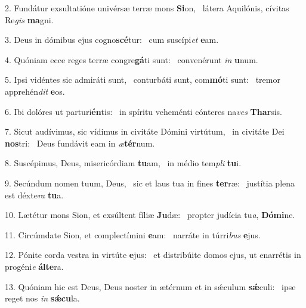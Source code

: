 2. Fundátur exsultatióne univérsæ terræ mons \textbf{Si}on, \ast\  látera Aquilónis, cívitas Re\textit{gis} \textbf{ma}gni.\

3. Deus in dómibus ejus cogno\textbf{scé}tur: \ast\  cum suscípi\textit{et} \textbf{e}am.\

4. Quóniam ecce reges terræ congre\textbf{gá}ti sunt: \ast\  convenérunt \textit{in} \textbf{u}num.\

5. Ipsi vidéntes sic admiráti sunt, \dag\  conturbáti sunt, com\textbf{mó}ti sunt: \ast\  tremor apprehén\textit{dit} \textbf{e}os.\

6. Ibi dolóres ut parturi\textbf{én}tis: \ast\  in spíritu veheménti cónteres na\textit{ves} \textbf{Thar}sis.\

7. Sicut audívimus, sic vídimus in civitáte Dómini virtútum, \dag\  in civitáte Dei \textbf{nos}tri: \ast\  Deus fundávit eam in \textit{æ}\textbf{tér}num.\

8. Suscépimus, Deus, misericórdiam \textbf{tu}am, \ast\  in médio tem\textit{pli} \textbf{tu}i.\

9. Secúndum nomen tuum, Deus, \dag\  sic et laus tua in fines \textbf{ter}ræ: \ast\  justítia plena est déxte\textit{ra} \textbf{tu}a.\

10. Lætétur mons Sion, et exsúltent fíliæ \textbf{Ju}dæ: \ast\  propter judícia tu\textit{a}, \textbf{Dó}\textbf{mi}ne.\

11. Circúmdate Sion, et complectímini \textbf{e}am: \ast\  narráte in túrri\textit{bus} \textbf{e}jus.\

12. Pónite corda vestra in virtúte \textbf{e}jus: \ast\  et distribúite domos ejus, ut enarrétis in progéni\textit{e} \textbf{ál}\textbf{te}ra.\

13. Quóniam hic est Deus, Deus noster in ætérnum et in sǽculum \textbf{sǽ}culi: \ast\  ipse reget nos \textit{in} \textbf{sǽ}\textbf{cu}la.\

